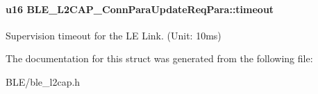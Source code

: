 \paragraph[{\texorpdfstring{timeout}{timeout}}]{\setlength{\rightskip}{0pt plus 5cm}u16 B\+L\+E\+\_\+\+L2\+C\+A\+P\+\_\+\+Conn\+Para\+Update\+Req\+Para\+::timeout}\hypertarget{struct_b_l_e___l2_c_a_p___conn_para_update_req_para_a696a87b0588ddf3ca407dd36a1e39fc8}{}\label{struct_b_l_e___l2_c_a_p___conn_para_update_req_para_a696a87b0588ddf3ca407dd36a1e39fc8}
Supervision timeout for the LE Link. (Unit\+: 10ms) 

The documentation for this struct was generated from the following file\+:\begin{DoxyCompactItemize}
\item 
B\+L\+E/ble\+\_\+l2cap.\+h\end{DoxyCompactItemize}
